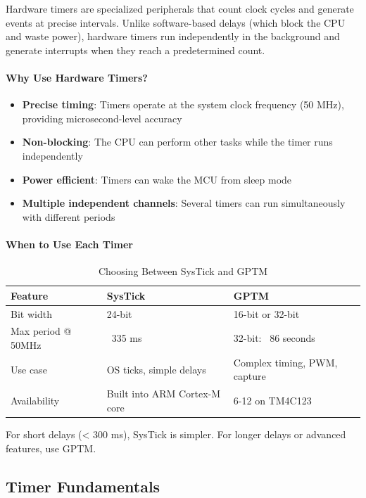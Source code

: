 Hardware timers are specialized peripherals that count clock cycles and generate events at precise intervals. Unlike software-based delays (which block the CPU and waste power), hardware timers run independently in the background and generate interrupts when they reach a predetermined count.

\paragraph*{Why Use Hardware Timers?}

\begin{itemize}[nosep]
  \item \textbf{Precise timing}: Timers operate at the system clock frequency (50 MHz), providing microsecond-level accuracy
  \item \textbf{Non-blocking}: The CPU can perform other tasks while the timer runs independently
  \item \textbf{Power efficient}: Timers can wake the MCU from sleep mode
  \item \textbf{Multiple independent channels}: Several timers can run simultaneously with different periods
\end{itemize}

\paragraph*{When to Use Each Timer}

\begin{table}[H]
  \centering
  \small
  \begin{tabular}{l l l}
    \toprule
    \textbf{Feature} & \textbf{SysTick} & \textbf{GPTM} \\
    \midrule
    Bit width & 24-bit & 16-bit or 32-bit \\
    Max period @ 50MHz & ~335 ms & 32-bit: ~86 seconds \\
    Use case & OS ticks, simple delays & Complex timing, PWM, capture \\
    Availability & Built into ARM Cortex-M core & 6-12 on TM4C123 \\
    \bottomrule
  \end{tabular}
  \caption{Choosing Between SysTick and GPTM}
\end{table}

\noindent
For short delays (< 300 ms), SysTick is simpler. For longer delays or advanced features, use GPTM.

\subsection{Timer Fundamentals}

